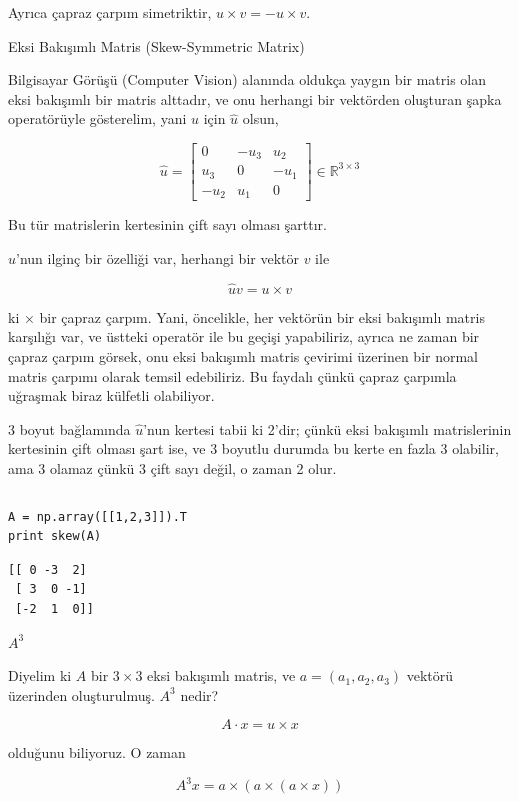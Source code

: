 \documentclass[12pt,fleqn]{article}\usepackage{../../common}
\begin{document}
Ayrıca çapraz çarpım simetriktir, $u \times v = - u \times v$. 

Eksi Bakışımlı Matris (Skew-Symmetric Matrix)

Bilgisayar Görüşü (Computer Vision) alanında oldukça yaygın bir matris olan
eksi bakışımlı bir matris alttadır, ve onu herhangi bir vektörden oluşturan
şapka operatörüyle gösterelim, yani $u$ için $\hat{u}$ olsun,

$$ 
\hat{u} = \left[\begin{array}{rrr}
0 & -u_3 & u_2 \\
u_3 & 0 & -u_1 \\
-u_2 & u_1 & 0
\end{array}\right] \in \mathbb{R}^{3 \times 3}
 $$

Bu tür matrislerin kertesinin çift sayı olması şarttır.

$\hat{u}$'nun ilginç bir özelliği var, herhangi bir vektör $v$ ile

$$ \hat{u}v = u \times v $$

ki $\times$ bir çapraz çarpım. Yani, öncelikle, her vektörün bir eksi
bakışımlı matris karşılığı var, ve üstteki operatör ile bu geçişi
yapabiliriz, ayrıca ne zaman bir çapraz çarpım görsek, onu eksi bakışımlı
matris çevirimi üzerinen bir normal matris çarpımı olarak temsil
edebiliriz. Bu faydalı çünkü çapraz çarpımla uğraşmak biraz külfetli
olabiliyor. 

3 boyut bağlamında $\hat{u}$'nun kertesi tabii ki 2'dir; çünkü eksi
bakışımlı matrislerinin kertesinin çift olması şart ise, ve 3 boyutlu
durumda bu kerte en fazla 3 olabilir, ama 3 olamaz çünkü 3 çift sayı değil,
o zaman 2 olur.

\inputminted[fontsize=\footnotesize]{python}{skew.py}

\begin{verbatim}
A = np.array([[1,2,3]]).T
print skew(A)
\end{verbatim}

\begin{verbatim}
[[ 0 -3  2]
 [ 3  0 -1]
 [-2  1  0]]
\end{verbatim}

$A^3$

Diyelim ki $A$ bir $3 \times 3$ eksi bakışımlı matris, ve $a =
(a_1,a_2,a_3)$ vektörü üzerinden oluşturulmuş. $A^3$ nedir? 

$$A \cdot x = u \times x$$

olduğunu biliyoruz. O zaman 

$$A^3 x = a \times ( a \times ( a \times x))$$
\end{document}
